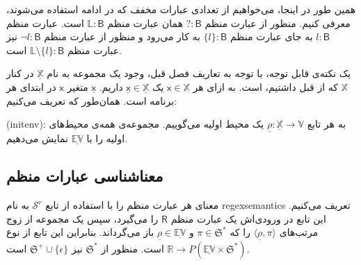 همین‌ طور در اینجا، می‌خواهیم از تعدادی عبارات مخفف که در ادامه استفاده می‌شوند، معرفی کنیم. منظور از عبارت منظم 
$\mathsf{? : B}$
همان عبارت منظم
$\mathbb{L}\mathsf{ : B}$
است. عبارت منظم 
$l : \mathsf{B}$
به جای عبارت منظم 
$\{l\} : \mathsf{B}$
به کار می‌رود و منظور از عبارت منظم
$\neg l \mathsf{: B}$
نیز عبارت منظم 
$\mathbb{L}\setminus\{l\}:\mathsf{B}$
است. 

یک نکته‌ی قابل توجه، با توجه به تعاریف فصل قبل، وجود یک مجموعه به نام
$\mathbb{\underline{X}}$
در کنار 
$\mathbb{X}$
که از قبل داشتیم، است. به ازای هر 
$\mathsf{x}\in\mathbb{X}$
یک 
$\mathsf{\underline{x}}\in\mathbb{\underline{X}}$
داریم. 
$\mathsf{\underline{x}}$
متغیر 
$\mathsf{x}$
در ابتدای هر برنامه است.  همان‌طور که تعریف می‌کنیم:
\begin{defn}
	(\gls{initenv}): به هر تابع  
	$\underline{\rho}:\underline{\mathbb{X}}\rightarrow\mathbb{V}$
	یک محیط اولیه می‌گوییم. مجموعه‌ی همه‌ی محیط‌های اولیه را با 
	$\underline{\mathbb{EV}}$
	نمایش می‌دهیم.
\end{defn}
 
\subsection{معناشناسی عبارات منظم}
معنای هر عبارت منظم را با استفاده از تابع 
$\mathcal{S}^r$
به نام \gls{regexsemantics} تعریف می‌کنیم. این تابع در ورودی‌اش یک عبارت منظم 
$\mathsf{R}$
را می‌گیرد، سپس یک مجموعه از زوج مرتب‌های
$\langle\underline{\rho} , \pi\rangle$
را که 
$\pi \in \mathfrak{S^*}$
و 
$\underline{\rho} \in \underline{\mathbb{EV}}$
باز می‌گرداند. بنابراین این تابع از نوع
$\mathbb{R} \rightarrow \mathit{P} (\mathbb{\underline{EV}} \times \mathfrak{S}^*)$
است.
 منظور از 
 $\mathfrak{S}^*$
 نیز 
 $\mathfrak{S}^+ \cup \{\epsilon\}$
 است.
 
